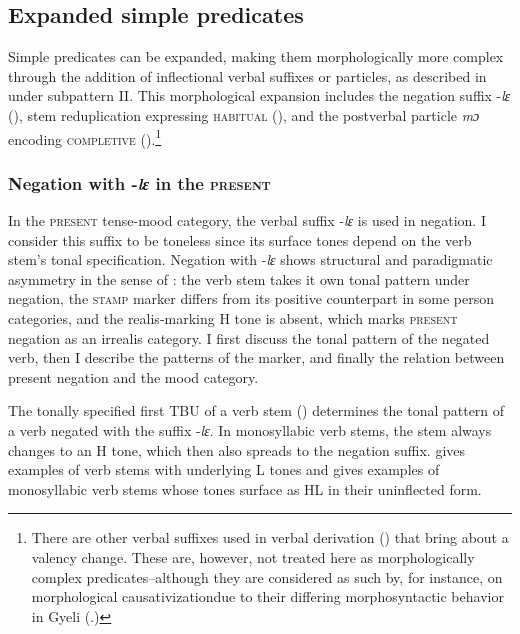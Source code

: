 \subsection{Expanded simple predicates}
\label{sec:MorphSimp}

Simple predicates can be expanded, making them morphologically more complex through the addition of inflectional verbal suffixes or particles, as described in  under subpattern II. This morphological expansion includes the negation suffix -{\itshape lɛ} (), stem reduplication expressing \textsc{habitual} (), and the postverbal particle {\itshape mɔ} encoding \textsc{completive}  ().\footnote{There are other verbal suffixes used in verbal derivation () that bring about a  valency change. These are, however, not treated here as morphologically complex predicates--although they are considered as such by, for instance, \citet[51]{butt2010} on morphological causativization{\textemdash}due to their differing morphosyntactic behavior in Gyeli (.)}









\subsubsection{Negation with -{\itshape lɛ} in the \textsc{present}}
\label{sec:NEGPRES}

In the \textsc{present} tense-mood category, the verbal suffix -{\itshape lɛ} is used in negation. I consider this suffix to be toneless since its surface tones depend on the verb stem's tonal specification. Negation with -{\itshape lɛ} shows structural and paradigmatic asymmetry in the sense of : the verb stem takes it own tonal pattern under negation, the \textsc{stamp} marker differs from its positive counterpart in some person categories, and the realis-marking H tone is absent, which marks \textsc{present} negation as an irrealis category. I first discuss the tonal pattern of the negated verb, then I describe the patterns of the {\STAMP} marker, and finally the relation between present negation and the mood category. 


The tonally specified first TBU of a verb stem () determines the tonal pattern of a verb negated with the suffix -{\itshape lɛ}. In monosyllabic verb stems, the stem always changes to an H tone, which then also spreads to the negation suffix.  gives examples of verb stems with underlying L tones and  gives examples of monosyllabic verb stems whose tones surface as HL in their uninflected form.


